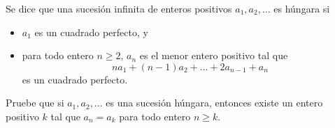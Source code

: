 Se dice que una sucesión infinita de enteros positivos $a_1, a_2, \dots$ es húngara si
 \begin{itemize} 
 \item  $a_1$ es un cuadrado perfecto, y
 \item  para todo entero $n\ge 2$, $a_n$ es el menor entero positivo tal que \[na_1+(n-1)a_2+\dots+2a_{n-1}+a_n\]
es un cuadrado perfecto.
 \end{itemize} 
Pruebe que si $a_1, a_2, \dots$ es una sucesión húngara, entonces existe un entero positivo $k$ tal que $a_n=a_k$ para todo entero $n\geq k$.
